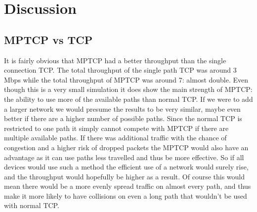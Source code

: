 \documentclass[11pt,twocolumn]{article}
\begin{document}

\section{Discussion}

\subsection{MPTCP vs TCP}
It is fairly obvious that MPTCP had a better throughput than the single connection TCP. The total throughput of the single path TCP was around 3 Mbps while the total throughput of MPTCP was around 7: almost double. Even though this is a very small simulation it does show the main strength of MPTCP: the ability to use more of the available paths than normal TCP. If we were to add a larger network we would presume the results to be very similar, maybe even better if there are a higher number of possible paths. Since the normal TCP is restricted to one path it simply cannot compete with MPTCP if there are multiple available paths. If there was additional traffic with the chance of congestion and a higher risk of dropped packets the MPTCP would also have an advantage as it can use paths less travelled and thus be more effective. So if all devices would use such a method the efficient use of a network would surely rise, and the throughput would hopefully be higher as a result. Of course this would mean there would be a more evenly spread traffic on almost every path, and thus make it more likely to have collisions on even a long path that wouldn't be used with normal TCP.
\end{document}
